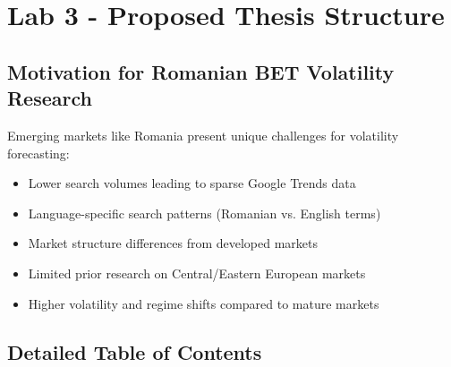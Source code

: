 \documentclass[12pt,a4paper]{article}
\begin{document}
\newpage
\section{Lab 3 - Proposed Thesis Structure}

\subsection{Motivation for Romanian BET Volatility Research}

Emerging markets like Romania present unique challenges for volatility forecasting:
\begin{itemize}
    \item Lower search volumes leading to sparse Google Trends data
    \item Language-specific search patterns (Romanian vs. English terms)
    \item Market structure differences from developed markets
    \item Limited prior research on Central/Eastern European markets
    \item Higher volatility and regime shifts compared to mature markets
\end{itemize}

\subsection{Detailed Table of Contents}
\end{document}
